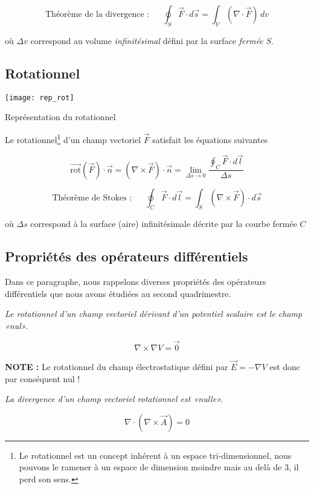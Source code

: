 \[\mbox{Théorème de la divergence : } \hspace{15pt} \oint_{S} \vec{F} \cdot d\vec{s} = \int_{V} (\nabla \cdot \vec{F}) \, dv\]

où $\Delta v$ correspond au volume \textit{infinitésimal} défini par la surface \textit{fermée} $S$.



\subsection{Rotationnel} 
\begin{marginfigure}
	\texttt{[image: rep\_rot]}
	\caption{Représentation du rotationnel}
\end{marginfigure}

Le rotationnel\footnote{Le rotationnel est un concept inhérent à un espace tri-dimensionnel, nous pouvons le ramener à un espace de dimension moindre 
mais au delà de 3, il perd son sens.} d'un champ vectoriel $\vec{F}$ satisfait les équations suivantes  

\[  \vec{\text{rot}}(\vec{F}) \cdot \vec{n}   = (\nabla \times \vec{F}) \cdot \vec{n} = \lim_{\Delta s \to 0} \frac{\oint_{C} \vec{F} \cdot d\vec{l} }{\Delta s}\]

\[\mbox{Théorème de Stokes : } \hspace{15pt} \oint_{C} \vec{F} \cdot d\vec{l} = \int_{S} (\nabla \times \vec{F}) \cdot d\vec{s}\]

où $\Delta s$ correspond à la surface (aire) infinitésimale décrite par la courbe fermée $C$

\subsection{Propriétés des opérateurs différentiels}

Dans ce paragraphe, nous rappelons diverses propriétés des opérateurs différentiels que nous avons étudiées au second quadrimestre. 

\textit{Le rotationnel d'un champ vectoriel dérivant d'un potentiel scalaire est le champ «nul».} 

\[\nabla \times \nabla V = \vec{0} \] 

\textbf{NOTE :} Le rotationnel du champ électrostatique défini par $\vec{E} = -\nabla V$ est donc par conséquent nul !

\textit{La divergence d'un champ vectoriel rotationnel est  «nulle».}  

\[\nabla \cdot (\nabla \times \vec{A})  = 0 \]

